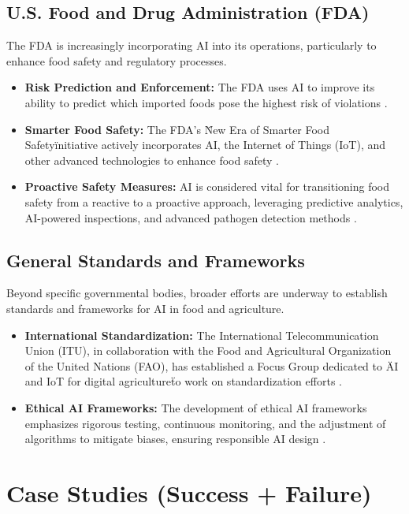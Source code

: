 \subsection{U.S. Food and Drug Administration (FDA)}
The FDA is increasingly incorporating AI into its operations, particularly to enhance food safety and regulatory processes.
\begin{itemize}
    \item \textbf{Risk Prediction and Enforcement:} The FDA uses AI to improve its ability to predict which imported foods pose the highest risk of violations \cite{FDA_AI_RiskPrediction}.
    \item \textbf{Smarter Food Safety:} The FDA's \"New Era of Smarter Food Safety\" initiative actively incorporates AI, the Internet of Things (IoT), and other advanced technologies to enhance food safety \cite{FDA_SmarterFoodSafety}.
    \item \textbf{Proactive Safety Measures:} AI is considered vital for transitioning food safety from a reactive to a proactive approach, leveraging predictive analytics, AI-powered inspections, and advanced pathogen detection methods \cite{FoodSafety_AI_FDA}.
\end{itemize}

\subsection{General Standards and Frameworks}
Beyond specific governmental bodies, broader efforts are underway to establish standards and frameworks for AI in food and agriculture.
\begin{itemize}
    \item \textbf{International Standardization:} The International Telecommunication Union (ITU), in collaboration with the Food and Agricultural Organization of the United Nations (FAO), has established a Focus Group dedicated to \"AI and IoT for digital agriculture\" to work on standardization efforts \cite{ITU_AI_IoT_Agriculture}.
    \item \textbf{Ethical AI Frameworks:} The development of ethical AI frameworks emphasizes rigorous testing, continuous monitoring, and the adjustment of algorithms to mitigate biases, ensuring responsible AI design \cite{AIOLA_Ethical_Frameworks}.
\end{itemize}

\section{Case Studies (Success + Failure)}

